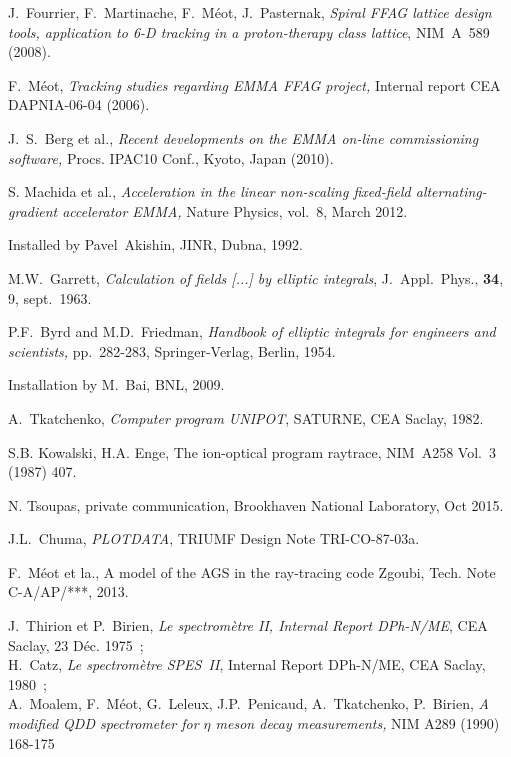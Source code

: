 \begin{thebibliography}{99}
J.~Fourrier, F.~Martinache, F.~M\'eot, J.~Pasternak, 
\textsl{Spiral FFAG lattice design tools,  application to 6-D tracking in a proton-therapy class lattice}, 
NIM~A~589 (2008). 

F.~M\'eot, 
\textsl{Tracking studies regarding EMMA FFAG project, }
Internal report CEA DAPNIA-06-04 (2006). 

J.~S.~Berg et al., 
\textsl{Recent developments on the EMMA on-line commissioning software,} 
Procs. IPAC10 Conf., Kyoto, Japan (2010). 

S. Machida et al., 
\textsl{Acceleration in the linear non-scaling fixed-field alternating-gradient accelerator EMMA, }
Nature Physics, vol.~8, March 2012.

 Installed by Pavel~Akishin, JINR, Dubna, 1992.

M.W.~Garrett, 
\textsl{Calculation of fields  [...] by elliptic integrals}, 
J.~Appl.~Phys., \textbf{34}, 9, sept.~1963.  

P.F.~Byrd and M.D.~Friedman, 
\textsl{Handbook of elliptic integrals for engineers and scientists,} 
pp.~282-283, Springer-Verlag, Berlin, 1954.  

 Installation by M.~Bai, BNL, 2009.  

A.~Tkatchenko, 
\textsl{Computer program UNIPOT}, 
SATURNE, CEA Saclay, 1982. 

S.B. Kowalski, H.A. Enge, 
The ion-optical program raytrace, 
NIM~A258 Vol.~3 (1987) 407. 

N. Tsoupas, private communication, Brookhaven National Laboratory, Oct 2015. 

J.L.~Chuma, 
\textsl{PLOTDATA}, 
TRIUMF Design Note TRI-CO-87-03a.

F.~M\'eot et la., 
A model of the AGS in the ray-tracing code Zgoubi, 
Tech. Note C-A/AP/***, 2013. 

J.~Thirion et P.~Birien, 
\textsl{Le spectrom\`etre II, Internal Report DPh-N/ME}, 
CEA Saclay, 23 D\'ec. 1975~; \\
H.~Catz, 
\textsl{Le spectrom\`etre SPES~II}, Internal Report DPh-N/ME, CEA Saclay, 1980~; \\
 A.~Moalem, F.~M\'eot, G.~Leleux, J.P.~Penicaud, A.~Tkatchenko, P.~Birien,  
\textsl{A modified QDD spectrometer for $\eta$ meson decay measurements,  } 
NIM A289 (1990) 168-175 


\end{thebibliography}
